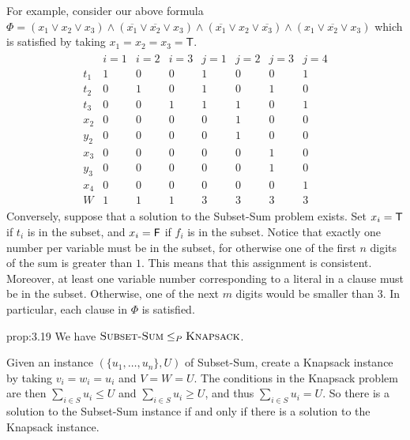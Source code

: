 \begin{pf}
    \newpage 
    For example, consider our above formula 
    $\Phi = (x_1 \vee x_2 \vee x_3) \wedge 
    (\overline{x_1} \vee \overline{x_2} \vee x_3) \wedge 
    (\overline{x_1} \vee x_2 \vee \overline{x_3}) \wedge 
    (x_1 \vee \overline{x_2} \vee x_3)$ which is satisfied by 
    taking $x_1 = x_2 = x_3 = \textsf{T}$. 
    \begin{align*}
        \begin{array}{c|ccc|cccc}
            & i=1 & i=2 & i=3 & j=1 & j=2 & j=3 & j=4 \\ \hline 
            t_1 & 1 & 0 & 0 & 1 & 0 & 0 & 1 \\ 
            t_2 & 0 & 1 & 0 & 1 & 0 & 1 & 0 \\ 
            t_3 & 0 & 0 & 1 & 1 & 1 & 0 & 1 \\ \hline 
            x_2 & 0 & 0 & 0 & 0 & 1 & 0 & 0 \\ 
            y_2 & 0 & 0 & 0 & 0 & 1 & 0 & 0 \\ 
            x_3 & 0 & 0 & 0 & 0 & 0 & 1 & 0 \\
            y_3 & 0 & 0 & 0 & 0 & 0 & 1 & 0 \\ 
            x_4 & 0 & 0 & 0 & 0 & 0 & 0 & 1 \\ \hline 
            W   & 1 & 1 & 1 & 3 & 3 & 3 & 3
        \end{array}
    \end{align*}
    Conversely, suppose that a solution to the {\sc Subset-Sum} problem exists. 
    Set $x_i = {\sf T}$ if $t_i$ is in the subset, and $x_i = {\sf F}$ if 
    $f_i$ is in the subset. Notice that exactly one number per variable 
    must be in the subset, for otherwise one of the first $n$ digits of the 
    sum is greater than $1$. This means that this assignment is consistent. 
    Moreover, at least one variable number corresponding to a literal 
    in a clause must be in the subset. Otherwise, one of the next $m$ 
    digits would be smaller than $3$. In particular, each clause in 
    $\Phi$ is satisfied. 
\end{pf}

\begin{prop}{prop:3.19}
    We have $\textsc{Subset-Sum} \leq_P \textsc{Knapsack}$. 
\end{prop}
\begin{pf}
    Given an instance $(\{u_1, \dots, u_n\}, U)$ of {\sc Subset-Sum}, 
    create a {\sc Knapsack} instance by taking $v_i = w_i = u_i$ and 
    $V = W = U$. The conditions in the {\sc Knapsack} problem are then 
    $\sum_{i\in S} u_i \leq U$ and $\sum_{i\in S} u_i \geq U$, and thus 
    $\sum_{i\in S} u_i = U$. So there is a solution to the {\sc Subset-Sum} 
    instance if and only if there is a solution to the {\sc Knapsack}
    instance. 
\end{pf}


